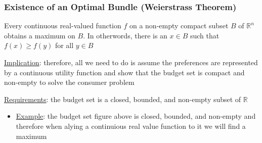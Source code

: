 \documentclass{article}
\begin{document}
\subsubsection{Existence of an Optimal Bundle (Weierstrass Theorem)}
Every continuous real-valued function $f$ on a non-empty compact subset $B$ of $\mathbb{R}^{n}$ obtains a maximum on $B$. In otherwords, there is an $x \in B$ such that $f(x) \geq f(y)$ for all $y \in B$ \par \vspace{0.3em}
  \underline{Implication}: therefore, all we need to do is assume the preferences are represented by a continuous utility function and show that the budget set is compact and non-empty to solve the consumer problem \par
  \underline{Requirements}: the budget set is a closed, bounded, and non-empty subset of $\mathbb{R}$
  \begin{itemize}
    \item  \underline{Example}: the budget set figure above is closed, bounded, and non-empty and therefore when alying a continuious real value function to it we will find a maximum
  \end{itemize}
\vspace{6mm}
\end{document}
